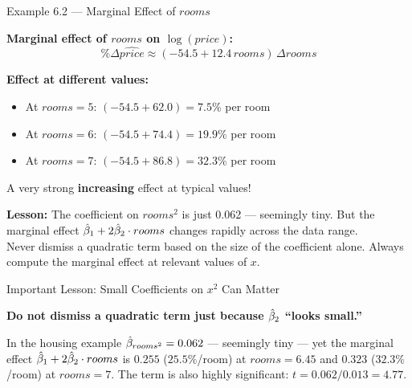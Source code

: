 \documentclass[aspectratio=169, 12pt]{beamer}
\begin{document}
\begin{frame}[shrink=8]{Example 6.2 --- Marginal Effect of $rooms$}

  \begin{keybox}
    \textbf{Marginal effect of $rooms$ on $\log(price)$:}
    \[
      \%\Delta \widehat{price} \approx (-54.5 + 12.4\, rooms)\, \Delta rooms
    \]
  \end{keybox}

  \medskip

      \textbf{Effect at different values:}
      \begin{itemize}
        \item At $rooms = 5$: $(-54.5 + 62.0) = 7.5\%$ per room
        \item At $rooms = 6$: $(-54.5 + 74.4) = 19.9\%$ per room
        \item At $rooms = 7$: $(-54.5 + 86.8) = 32.3\%$ per room
      \end{itemize}

      \medskip

      A very strong \textbf{increasing} effect at typical values!
  \medskip

      \begin{highlightbox}
        \textbf{Lesson:} The coefficient on $rooms^2$ is just 0.062 ---
        seemingly tiny. But the marginal effect $\hat{\beta}_1 + 2\hat{\beta}_2 \cdot rooms$
        changes rapidly across the data range. \\[4pt]
        Never dismiss a quadratic term based on the size
        of the coefficient alone. Always compute the marginal
        effect at relevant values of $x$.
      \end{highlightbox}

\end{frame}

\begin{frame}{Important Lesson: Small Coefficients on $x^2$ Can Matter}

  \begin{highlightbox}
    \textbf{Do not dismiss a quadratic term just because $\hat{\beta}_2$ ``looks small.''}
  \end{highlightbox}

  \medskip

  In the housing example $\hat{\beta}_{rooms^2} = 0.062$ --- seemingly tiny --- yet the
  marginal effect $\hat{\beta}_1 + 2\hat{\beta}_2\cdot rooms$ is $0.255$ ($25.5\%$/room) at
  $rooms = 6.45$ and $0.323$ ($32.3\%$/room) at $rooms = 7$. The term is also highly
  significant: $t = 0.062/0.013 = 4.77$.

\end{frame}
\end{document}
